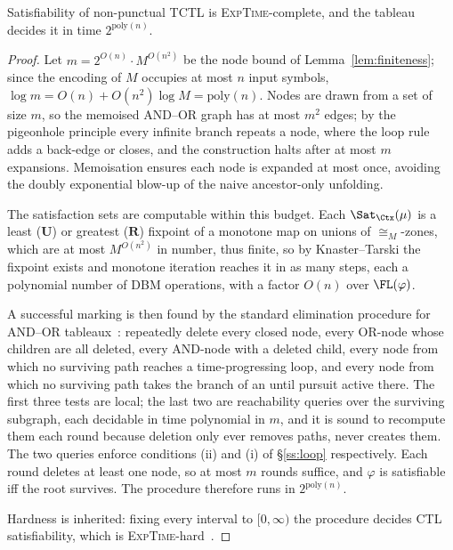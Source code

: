 \begin{theorem}\label{thm:complexity}
Satisfiability of non-punctual TCTL is \textsc{ExpTime}-complete, and the tableau
decides it in time $2^{\mathrm{poly}(n)}$.
\end{theorem}
\begin{proof}
Let $m=2^{O(n)}\cdot M^{O(n^2)}$ be the node bound of Lemma~\ref{lem:finiteness}; since the
encoding of $M$ occupies at most $n$ input symbols, $\log m=O(n)+O(n^2)\log M=\mathrm{poly}(n)$.
Nodes are drawn from a set of size $m$, so the memoised AND--OR graph has at most $m^2$ edges;
by the pigeonhole principle every infinite branch repeats a node, where the loop rule adds a
back-edge or closes, and the construction halts after at most $m$ expansions. Memoisation ensures each node is expanded at most once, avoiding the doubly exponential
blow-up of the naive ancestor-only unfolding.
%

The satisfaction sets are computable within this budget. Each
$\Sat_{\Ctx}(\mu)$ is a least ($\mathbf{U}$) or greatest ($\mathbf{R}$) fixpoint of a monotone map on unions of $\cong_M$-zones, which are at most $M^{O(n^2)}$ in number, thus finite, so by Knaster--Tarski the
fixpoint exists and monotone iteration reaches it in as many steps, each a polynomial number of
DBM operations, with a factor $O(n)$ over $\FL(\varphi)$.


A successful marking is then found by the standard elimination procedure for
AND--OR tableaux~\cite{Clarke99,tableau_ctl}: repeatedly delete every closed node,
every OR-node whose children are all deleted, every AND-node with a deleted
child, every node from which no surviving path reaches a time-progressing loop,
and every node from which no surviving path takes the  branch of
an until pursuit active there. The first three tests are local; the last two are
reachability queries over the surviving subgraph, each decidable in time
polynomial in $m$, and it is sound to recompute them each round because deletion
only ever removes paths, never creates them. The two queries enforce conditions
(ii) and (i) of \S\ref{ss:loop} respectively. Each round deletes at least one
node, so at most $m$ rounds suffice, and $\varphi$ is satisfiable iff the root
survives. The procedure therefore runs in $2^{\mathrm{poly}(n)}$.

Hardness is inherited: fixing every interval to $[0,\infty)$ the procedure decides CTL
satisfiability, which is \textsc{ExpTime}-hard~\cite{Clarke99}.



\end{proof}
